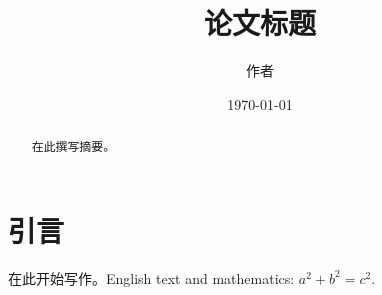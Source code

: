 \documentclass[UTF8,11pt]{ctexart}
\title{论文标题}
\author{作者}
\date{\today}
\begin{document}
\maketitle
\begin{abstract}
在此撰写摘要。
\end{abstract}
\section{引言}
在此开始写作。English text and mathematics: $a^2+b^2=c^2$.
\end{document}
